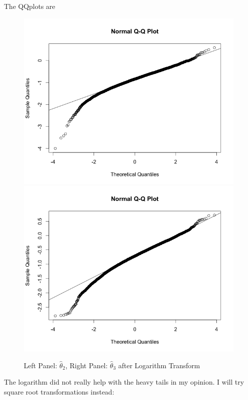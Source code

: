 \documentclass[11pt]{article}
\begin{document}
\begin{enumerate}
\begin{enumerate}
			The QQplots are
			\begin{figure}[H]
				\includegraphics[scale=0.4]{Rplot04}
				\includegraphics[scale=0.4]{Rplot05}
				\caption{Left Panel: $\widehat{\theta}_2$, Right Panel: $\widehat{\theta}_3$ after Logarithm Transform}
			\end{figure}
			The logarithm did not really help with the heavy tails in my opinion. I will try square root transformations instead:
			\begin{figure}[H]
			\centering

\end{figure}
\end{enumerate}
\end{enumerate}
\end{document}

